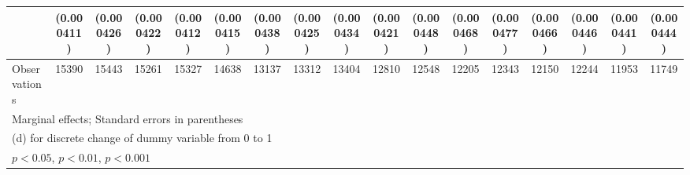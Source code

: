 {\begin{tabular}{l*{16}{c}}
                    &  (0.000411)         &  (0.000426)         &  (0.000422)         &  (0.000412)         &  (0.000415)         &  (0.000438)         &  (0.000425)         &  (0.000434)         &  (0.000421)         &  (0.000448)         &  (0.000468)         &  (0.000477)         &  (0.000466)         &  (0.000446)         &  (0.000441)         &  (0.000444)         \\
\hline
Observations        &       15390         &       15443         &       15261         &       15327         &       14638         &       13137         &       13312         &       13404         &       12810         &       12548         &       12205         &       12343         &       12150         &       12244         &       11953         &       11749         \\
\hline\hline
\multicolumn{17}{l}{\footnotesize Marginal effects; Standard errors in parentheses}\\
\multicolumn{17}{l}{\footnotesize  (d) for discrete change of dummy variable from 0 to 1}\\
\multicolumn{17}{l}{\footnotesize \sym{*} \(p<0.05\), \sym{**} \(p<0.01\), \sym{***} \(p<0.001\)}\\
\end{tabular}
}
